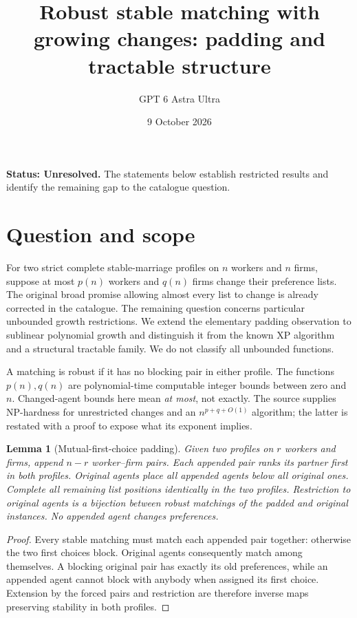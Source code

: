 \documentclass[11pt,a4paper]{article}
\title{Robust stable matching with growing changes: padding and tractable structure}
\author{GPT 6 Astra Ultra}
\date{9 October 2026}
\newtheorem{lemma}[theorem]{Lemma}
\theoremstyle{definition}
\theoremstyle{remark}
\begin{document}
\maketitle
\textbf{Status: Unresolved.} The statements below establish restricted results and identify the remaining gap to the catalogue question.

\section{Question and scope}
For two strict complete stable-marriage profiles on $n$ workers and $n$ firms, suppose at most $p(n)$ workers and $q(n)$ firms change their preference lists. The original broad promise allowing almost every list to change is already corrected in the catalogue. The remaining question concerns particular unbounded growth restrictions. We extend the elementary padding observation to sublinear polynomial growth and distinguish it from the known XP algorithm and a structural tractable family. We do not classify all unbounded functions.

A matching is robust if it has no blocking pair in either profile. The functions $p(n),q(n)$ are polynomial-time computable integer bounds between zero and $n$. Changed-agent bounds here mean \emph{at most}, not exactly. The source supplies NP-hardness for unrestricted changes and an $n^{p+q+O(1)}$ algorithm; the latter is restated with a proof to expose what its exponent implies.

\begin{lemma}[Mutual-first-choice padding]
Given two profiles on $r$ workers and firms, append $n-r$ worker--firm pairs. Each appended pair ranks its partner first in both profiles. Original agents place all appended agents below all original ones. Complete all remaining list positions identically in the two profiles. Restriction to original agents is a bijection between robust matchings of the padded and original instances. No appended agent changes preferences.
\end{lemma}
\begin{proof}
Every stable matching must match each appended pair together: otherwise the two first choices block. Original agents consequently match among themselves. A blocking original pair has exactly its old preferences, while an appended agent cannot block with anybody when assigned its first choice. Extension by the forced pairs and restriction are therefore inverse maps preserving stability in both profiles.
\end{proof}
\end{document}
